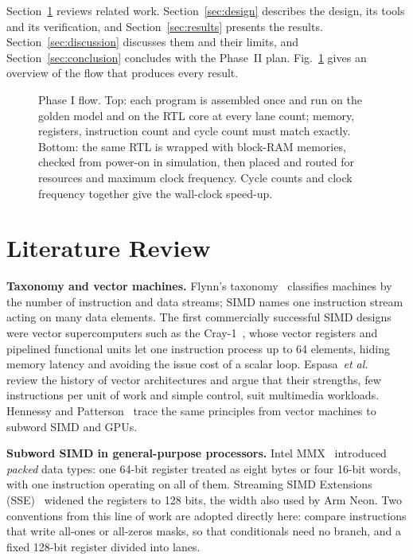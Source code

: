 \documentclass[journal]{IEEEtran}
\begin{document}
Section~\ref{sec:lit} reviews related work. Section~\ref{sec:design} describes the
design, its tools and its verification, and Section~\ref{sec:results} presents the
results. Section~\ref{sec:discussion} discusses them and their limits, and
Section~\ref{sec:conclusion} concludes with the Phase~II plan. Fig.~\ref{fig:flow}
gives an overview of the flow that produces every result.

\begin{figure}[t]
\centering

\caption{Phase I flow. Top: each program is assembled once and run on the golden model
and on the RTL core at every lane count; memory, registers, instruction count and cycle
count must match exactly. Bottom: the same RTL is wrapped with block-RAM memories,
checked from power-on in simulation, then placed and routed for resources and maximum
clock frequency. Cycle counts and clock frequency together give the wall-clock speed-up.}
\label{fig:flow}
\end{figure}

\section{Literature Review}\label{sec:lit}

\textbf{Taxonomy and vector machines.} Flynn's taxonomy~\cite{flynn72} classifies
machines by the number of instruction and data streams; SIMD names one instruction
stream acting on many data elements. The first commercially successful SIMD designs
were vector supercomputers such as the Cray-1~\cite{cray1}, whose vector registers and
pipelined functional units let one instruction process up to 64 elements, hiding memory
latency and avoiding the issue cost of a scalar loop. Espasa~\emph{et
al.}~\cite{espasa98} review the history of vector architectures and argue that their
strengths, few instructions per unit of work and simple control, suit multimedia
workloads. Hennessy and Patterson~\cite{hp6} trace the same principles from
vector machines to subword SIMD and GPUs.

\textbf{Subword SIMD in general-purpose processors.} Intel MMX~\cite{mmx} introduced
\emph{packed} data types: one 64-bit register treated as eight bytes or four 16-bit
words, with one instruction operating on all of them. Streaming SIMD Extensions
(SSE)~\cite{sse} widened the registers to 128 bits, the width also used by Arm Neon.
Two conventions from this line of work are adopted directly here: compare instructions
that write all-ones or all-zeros masks, so that conditionals need no branch, and a
fixed 128-bit register divided into lanes.
\end{document}

